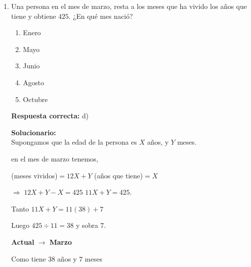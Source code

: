 \begin{enumerate}

\item Una persona en el mes de marzo, resta a los meses que ha vivido los años que tiene y obtiene $425$. ¿En qué mes nació?
\begin{enumerate}[label=\alph*)]
	\item Enero
	\item Mayo
	\item Junio
	\item Agosto
	\item Octubre
\end{enumerate}

\textbf{Respuesta correcta:} d)

\vspace{2mm}
\textbf{Solucionario:}\\

Supongamos que la edad de la persona es
$X$ años, y $Y$ meses.

en el mes de marzo tenemos,

(meses vividos)$=12X+Y$
(años que tiene)$=X$

$\Rightarrow\; 12X+Y-X=425$
$11X+Y=425.$

Tanto \quad $11X+Y=11(38)+7$

Luego \quad $425 \div 11 = 38$ \quad y sobra $7$.

\textbf{Actual} $\rightarrow$ \textbf{Marzo}

Como tiene $38$ años y $7$ meses

\end{enumerate}
